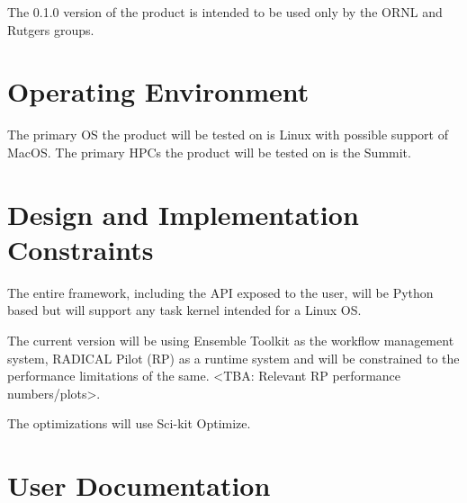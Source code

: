 \documentclass{scrreprt}
\def\myversion{0.1.0 }
\begin{document}
The \myversion version of the product is intended to be used only by the ORNL and Rutgers groups. 

\section{Operating Environment}

The primary OS the product will be tested on is Linux with possible support of MacOS. The primary HPCs the product will be tested on is the Summit.

\section{Design and Implementation Constraints}

The entire framework, including the API exposed to the user, will be Python based but will support any task kernel intended for a Linux OS.

The current version will be using Ensemble Toolkit as the workflow management system, RADICAL Pilot (RP) as a runtime system and will be constrained to the performance limitations of the same. <TBA: Relevant RP performance numbers/plots>.

The optimizations will use Sci-kit Optimize. 

\section{User Documentation}
\end{document}
